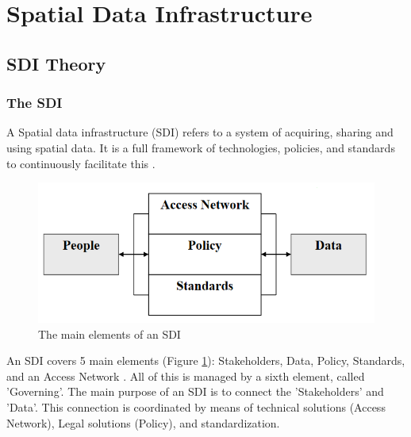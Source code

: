 \section{Spatial Data Infrastructure}


\subsection{SDI Theory}

\subsubsection{The SDI} 

A Spatial data infrastructure (SDI) refers to a system of acquiring, sharing and using spatial data. It is a full framework of technologies, policies, and standards to continuously facilitate this \citep{status_national_open_SDI_2020}. 

\begin{figure}
    \centering
    \graphicspath{ {images/} }
    \includegraphics[width=12cm]{SDI_elements}
    \caption{The main elements of an SDI}
    \label{fig:SDI_elements}
\end{figure}

An SDI covers 5 main elements (Figure \ref{fig:SDI_elements}): Stakeholders, Data, Policy, Standards, and an Access Network \citep{status_national_open_SDI_2020}. All of this is managed by a sixth element, called 'Governing'. The main purpose of an SDI is to connect the 'Stakeholders' and 'Data'. This connection is coordinated by means of technical solutions (Access Network), Legal solutions (Policy), and standardization.   

